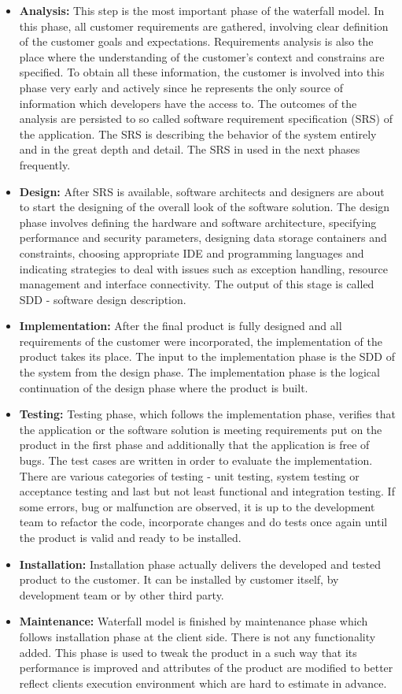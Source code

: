 \documentclass[12pt,final,oneside]{fithesis}
\begin{document}
\begin{itemize}
	\item \textbf{Analysis:} This step is the most important phase of the waterfall model. In this phase, all customer requirements are gathered, involving clear definition of the customer goals and expectations. Requirements analysis is also the place where the understanding of the customer's context and constrains are specified. To obtain all these information, the customer is involved into this phase very early and actively since he represents the only source of information which developers have the access to. The outcomes of the analysis are persisted to so called software requirement specification (SRS) of the application. The SRS is describing the behavior of the system entirely and in the great depth and detail. The SRS in used in the next phases frequently.
	\item \textbf{Design:} After SRS is available, software architects and designers are about to start the designing of the overall look of the software solution. The design phase involves defining the hardware and software architecture, specifying performance and security parameters, designing data storage containers and constraints, choosing appropriate IDE and programming languages and indicating strategies to deal with issues such as exception handling, resource management and interface connectivity. The output of this stage is called SDD - software design description.
	\item \textbf{Implementation:} After the final product is fully designed and all requirements of the customer were incorporated, the implementation of the product takes its place. The input to the implementation phase is the SDD of the system from the design phase. The implementation phase is the logical continuation of the design phase where the product is built.
	\item \textbf{Testing:} Testing phase, which follows the implementation phase, verifies that the application or the software solution is meeting requirements put on the product in the first phase and additionally that the application is free of bugs. The test cases are written in order to evaluate the implementation. There are various categories of testing - unit testing, system testing or acceptance testing and last but not least functional and integration testing. If some errors, bug or malfunction are observed, it is up to the development team to refactor the code, incorporate changes and do tests once again until the product is valid and ready to be installed.
	\item \textbf{Installation:} Installation phase actually delivers the developed and tested product to the customer. It can be installed by customer itself, by development team or by other third party.
	\item \textbf{Maintenance:} Waterfall model is finished by maintenance phase which follows installation phase at the client side. There is not any functionality added. This phase is used to tweak the product in a such way that its performance is improved and attributes of the product are modified to better reflect clients execution environment which are hard to estimate in advance.
\end{itemize}
\end{document}
